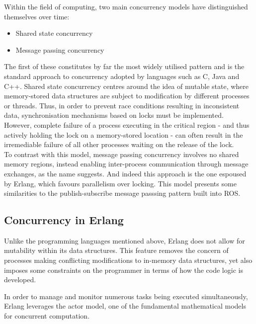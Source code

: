 \documentclass{l4proj}
\begin{document}
Within the field of computing, two main concurrency models have distinguished themselves over time:
\begin{itemize}
\item Shared state concurrency
\item Message passing concurrency
\end{itemize}

The first of these constitutes by far the most widely utilised pattern and is the standard approach to concurrency adopted by languages such as C, Java and C++.
Shared state concurrency centres around the idea of mutable state, where memory-stored data structures are subject to modification by different processes or threads. Thus, in order to prevent race conditions resulting in inconsistent data, synchronisation mechanisms based on locks must be implemented.\\

However, complete failure of a process executing in the critical region - and thus actively holding the lock on a memory-stored location - can often result in the irremediable failure of all other processes waiting on the release of the lock. \\

To contrast with this model, message passing concurrency involves no shared memory regions, instead enabling inter-process communication through message exchanges, as the name suggests. And indeed this approach is the one espoused by Erlang, which favours parallelism over locking.
This model presents some similarities to the publish-subscribe message passsing pattern built into ROS.\\

\subsection{Concurrency in Erlang}

Unlike the programming languages mentioned above, Erlang does not allow for mutability within its data structures. This feature removes the concern of processes making conflicting modifications to in-memory data structures, yet also imposes some constraints on the programmer in terms of how the code logic is developed.

In order to manage and monitor numerous tasks being executed simultaneously, Erlang leverages the actor model, one of the fundamental mathematical models for concurrent computation.
\end{document}
